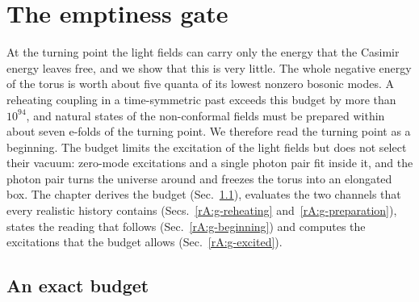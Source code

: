 \section{The emptiness gate}\label{rep:gate}

At the turning point the light fields can carry only the energy that the Casimir energy leaves free, and we show that this is very little.
The whole negative energy of the torus is worth about five quanta of its lowest nonzero bosonic modes. %
A reheating coupling in a time-symmetric past exceeds this budget by more than $10^{94}$, and natural states of the non-conformal fields must be prepared within about seven e-folds of the turning point. %
We therefore read the turning point as a beginning.
The budget limits the excitation of the light fields but does not select their vacuum: zero-mode excitations and a single photon pair fit inside it, and the photon pair turns the universe around and freezes the torus into an elongated box.
The chapter derives the budget (Sec.~\ref{rA:g-budget}), evaluates the two channels that every realistic history contains (Secs.~\ref{rA:g-reheating} and~\ref{rA:g-preparation}), states the reading that follows (Sec.~\ref{rA:g-beginning}) and computes the excitations that the budget allows (Sec.~\ref{rA:g-excited}).

\subsection{An exact budget}
\label{rA:g-budget}


